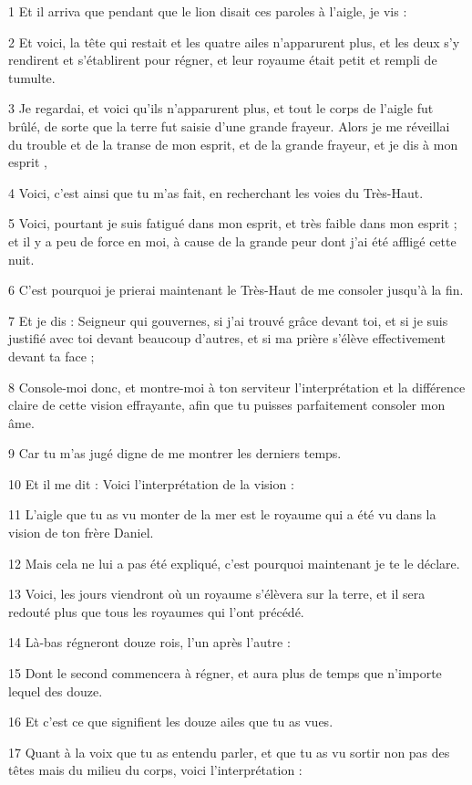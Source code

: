 \par 1 Et il arriva que pendant que le lion disait ces paroles à l'aigle, je vis :
\par 2 Et voici, la tête qui restait et les quatre ailes n'apparurent plus, et les deux s'y rendirent et s'établirent pour régner, et leur royaume était petit et rempli de tumulte.
\par 3 Je regardai, et voici qu'ils n'apparurent plus, et tout le corps de l'aigle fut brûlé, de sorte que la terre fut saisie d'une grande frayeur. Alors je me réveillai du trouble et de la transe de mon esprit, et de la grande frayeur, et je dis à mon esprit ,
\par 4 Voici, c'est ainsi que tu m'as fait, en recherchant les voies du Très-Haut.
\par 5 Voici, pourtant je suis fatigué dans mon esprit, et très faible dans mon esprit ; et il y a peu de force en moi, à cause de la grande peur dont j'ai été affligé cette nuit.
\par 6 C'est pourquoi je prierai maintenant le Très-Haut de me consoler jusqu'à la fin.
\par 7 Et je dis : Seigneur qui gouvernes, si j'ai trouvé grâce devant toi, et si je suis justifié avec toi devant beaucoup d'autres, et si ma prière s'élève effectivement devant ta face ;
\par 8 Console-moi donc, et montre-moi à ton serviteur l'interprétation et la différence claire de cette vision effrayante, afin que tu puisses parfaitement consoler mon âme.
\par 9 Car tu m'as jugé digne de me montrer les derniers temps.
\par 10 Et il me dit : Voici l'interprétation de la vision :
\par 11 L'aigle que tu as vu monter de la mer est le royaume qui a été vu dans la vision de ton frère Daniel.
\par 12 Mais cela ne lui a pas été expliqué, c'est pourquoi maintenant je te le déclare.
\par 13 Voici, les jours viendront où un royaume s'élèvera sur la terre, et il sera redouté plus que tous les royaumes qui l'ont précédé.
\par 14 Là-bas régneront douze rois, l'un après l'autre :
\par 15 Dont le second commencera à régner, et aura plus de temps que n'importe lequel des douze.
\par 16 Et c'est ce que signifient les douze ailes que tu as vues.
\par 17 Quant à la voix que tu as entendu parler, et que tu as vu sortir non pas des têtes mais du milieu du corps, voici l'interprétation :
